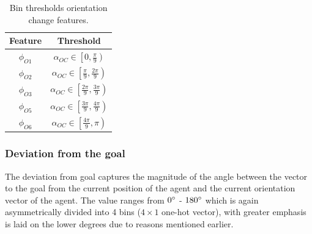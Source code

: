 \begin{table}[htbp]
    \caption{Bin thresholds orientation change features.}
    \label{orientation-change-bins}
    \begin{center}
        \renewcommand{\arraystretch}{1.3}
        \begin{tabular}{|c|c|}
            \hline
            Feature & Threshold \\
            \hline
            $\phi_{O1}$ & $\alpha_{OC} \in \left[ 0 , \frac{\pi}{9} \right)$ \\
            
            $\phi_{O2}$ & $\alpha_{OC} \in \left[ \frac{\pi}{9} , \frac{2\pi}{9} \right)$ \\
            
            $\phi_{O3}$ & $\alpha_{OC} \in \left[ \frac{2\pi}{9} , \frac{3\pi}{9} \right)$ \\
    
            
            $\phi_{O5}$ & $\alpha_{OC} \in \left[ \frac{3\pi}{9} , \frac{4\pi}{9} \right)$ \\
            
            $\phi_{O6}$ & $\alpha_{OC} \in \left[ \frac{4\pi}{9} , \pi \right)$ \\
            \hline
        \end{tabular}
    \end{center}
\end{table}
\subsubsection*{Deviation from the goal}
The deviation from goal captures the magnitude of the angle between the vector to the goal from the current position of the agent and the current orientation vector of the agent. The value ranges from $0 \degree$ - $ 180 \degree$ which is again asymmetrically divided into 4 bins ($4 \times 1$ one-hot vector), with greater emphasis is laid on the lower degrees due to reasons mentioned earlier. 

